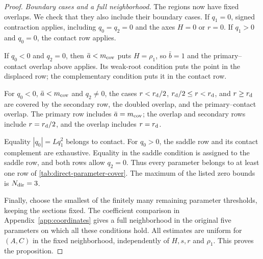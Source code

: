 \begin{proof}
\begin{table}[ht]
\end{table}

\emph{Boundary cases and a full neighborhood.}
The regions now have fixed overlaps. We check that they also include
their boundary cases. If \(q_1=0\), signed contraction applies, including
\(q_0=q_2=0\) and the axes \(H=0\) or \(r=0\). If \(q_1>0\)
and \(q_0=0\), the contact row applies.

If \(q_0<0\) and \(q_2=0\), then \(\bar a<m_{\rm cov}\) puts
\(H=\rho_1\), so \(\bar b=1\) and the primary--contact overlap
above applies. Its weak-root condition puts the point in the displaced
row; the complementary condition puts it in the contact row.

For \(q_0<0\), \(\bar a<m_{\rm cov}\) and \(q_2\ne0\), the
cases \(r<r_{\rm d}/2\), \(r_{\rm d}/2\le r<r_{\rm d}\), and
\(r\ge r_{\rm d}\) are covered by the secondary row, the doubled
overlap, and the primary--contact overlap. The primary row includes
\(\bar a=m_{\rm cov}\); the overlap and secondary rows include
\(r=r_{\rm d}/2\), and the overlap includes \(r=r_{\rm d}\).

Equality \(|q_0|=Lq_1^2\) belongs to contact. For \(q_0>0\), the
saddle row and its contact complement are exhaustive. Equality in the
saddle condition is assigned to the saddle row, and both rows allow
\(q_2=0\). Thus every parameter belongs to at least one row of
\cref{tab:direct-parameter-cover}. The maximum of the listed zero
bounds is \(N_{\rm dir}=3\).

Finally, choose the smallest of the finitely many remaining parameter
thresholds, keeping the sections fixed. The coefficient comparison in
Appendix~\ref{app:coordinates} gives a full neighborhood in the original
five parameters on which all these conditions hold. All estimates are
uniform for \((A,C)\) in the fixed neighborhood, independently of
\(H,s,r\) and \(\rho_1\). This proves the proposition.
\end{proof}

